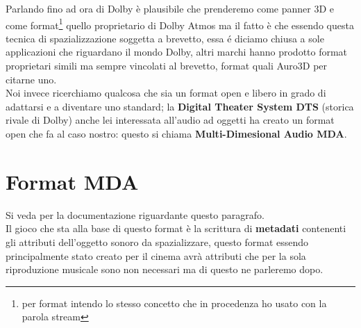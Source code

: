 \documentclass[12pt,a4paper]{report}
\begin{document}
Parlando fino ad ora di Dolby è plausibile che prenderemo come panner 3D e come format\footnote{per format intendo lo stesso concetto che in procedenza ho usato con la parola stream} quello proprietario di Dolby Atmos ma il fatto è che essendo questa tecnica di spazializzazione soggetta a brevetto, essa é diciamo chiusa a sole applicazioni che riguardano il mondo Dolby, altri marchi hanno prodotto format proprietari simili ma sempre vincolati al brevetto, format quali Auro3D per citarne uno.\\

Noi invece ricerchiamo qualcosa che sia un format open e libero in grado di adattarsi e a diventare uno standard; la \textbf{Digital Theater System DTS} (storica rivale di Dolby) anche lei interessata all'audio ad oggetti ha creato un format open che fa al caso nostro: questo si chiama \textbf{Multi-Dimesional Audio MDA}.\\

\section{Format MDA}

Si veda \cite{mda} per la documentazione riguardante questo paragrafo.\\

Il gioco che sta alla base di questo format è la scrittura di \textbf{metadati} contenenti gli attributi dell'oggetto sonoro da spazializzare, questo format essendo principalmente stato creato per il cinema avrà attributi che per la sola riproduzione musicale sono non necessari ma di questo ne parleremo dopo.\\
\end{document}
